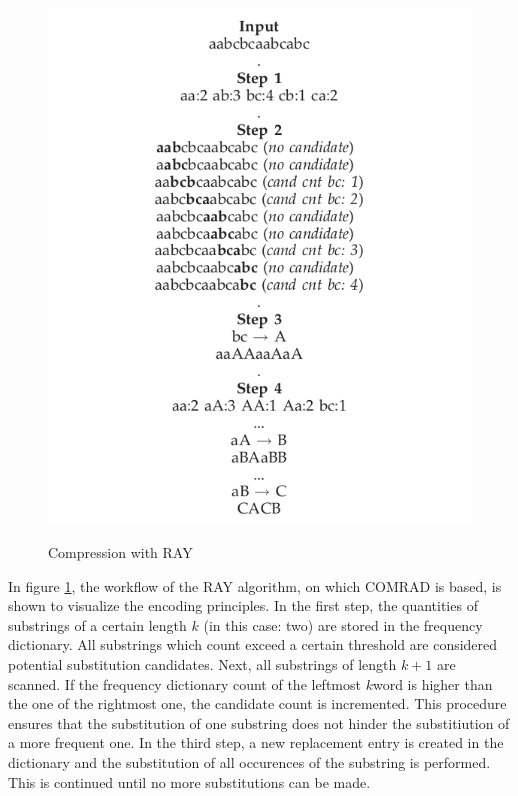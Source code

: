 \documentclass[acmtocl,acmnow]{article}
\begin{document}
  \begin{figure}
\begin{center}
    \includegraphics[height=\textwidth]{img/Comrad.png}
    \label{comrad}
    \caption{Compression with RAY}
\end{center}
  \end{figure}
In figure \ref{comrad}, the workflow of the RAY algorithm, on which COMRAD is based, is shown to visualize the 
encoding principles. In the first step, the quantities of substrings of a certain length $k$ (in this case: two)
are stored in the frequency dictionary. All substrings which count exceed a certain threshold are considered 
potential substitution candidates. Next, all substrings of length $k+1$ are scanned. If the frequency dictionary
count of the leftmost $k$word is higher than the one of the rightmost one, the candidate count is incremented.
This procedure ensures that the substitution of one substring does not hinder the substitiution of a more frequent one.
In the third step, a new replacement entry is created in the dictionary and the substitution of all occurences of the
substring is performed. This is continued until no more substitutions can be made.
\end{document}
